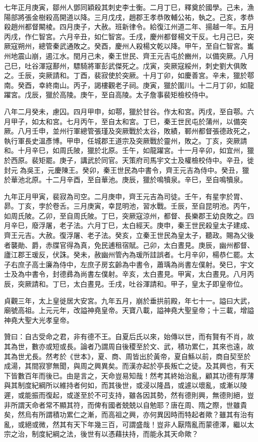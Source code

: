 \begin{pinyinscope}
 七年正月庚寅，鄒州人鄧同穎殺其刺史李士衡。二月丁巳，釋奠於國學。己未，漁陽部將張金樹殺高開道以降。三月戊戌，趙郡王孝恭敗輔公祐，執之。己亥，孝恭殺趙州都督闞棱。四月庚子，大赦。班新律令。給復江州道二年、揚越一年。五月丙戌，作仁智宮。六月辛丑，如仁智宮。壬戌，慶州都督楊文干反。七月己巳，突厥寇朔州，總管秦武通敗之。癸酉，慶州人殺楊文乾以降。甲午，至自仁智宮。巂州地震山崩，遏江水。閏月己未，秦王世民、齊王元吉屯於豳州，以備突厥。八月己巳，吐谷渾寇鄯州，驃騎將軍彭武傑死之。戊寅，突厥寇綏州，刺史劉大俱敗之。壬辰，突厥請和。丁酉，裴寂使於突厥。十月丁卯，如慶善宮。辛未，獵於鄠南。癸酉，幸終南山。丙子，謁樓觀老子祠。庚寅，獵於圍川。十二月丁卯，如龍躍宮。戊辰，獵於高陵。庚午，至自高陵。太子詹事裴矩檢校侍中。



 八年二月癸未，慮囚。四月甲申，如鄠，獵於甘谷。作太和宮。丙戌，至自鄠。六月甲子，如太和宮。七月丙午，至自太和宮。丁巳，秦王世民屯於蒲州，以備突厥。八月壬申，並州行軍總管張瑾及突厥戰於太谷，敗績，鄆州都督張德政死之，執行軍長史溫彥博。甲申，任城郡王道宗及突厥戰於靈州，敗之。丁亥，突厥請和。十月辛巳，如周氏陂，獵於北原。壬午，如龍躍宮。十一月辛卯，如宜州，獵於西原。裴矩罷。庚子，講武於同官。天策府司馬宇文士及權檢校侍中。辛丑，徙封元為吳王，元慶陳王。癸卯，秦王世民為中書令，齊王元吉為侍中。癸丑，獵於華池北原。十二月辛酉，至自華池。庚辰，獵於鳴犢泉。辛巳，至自鳴犢泉。



 九年正月甲寅，裴寂為司空。二月庚申，齊王元吉為司徒。壬午，有星孛於胃、昴。丁亥，孛於卷舌。三月庚寅，幸昆明池，習水戰。壬辰，至自昆明池。丙午，如周氏陂。乙卯，至自周氏陂。丁巳，突厥寇涼州，都督、長樂郡王幼良敗之。四月辛巳，廢浮屠，老子法。六月丁巳，太白經天。庚申，秦王世民殺皇太子建成、齊王元吉。大赦。復浮屠、老子法。癸亥，立秦王世民為皇太子，聽政。賜為父後者襲勛、爵，赤牒官得為真，免民逋租宿賦。己卯，太白晝見。庚辰，幽州都督、廬江郡王瑗反，伏誅。癸未，赦幽州管內為瑗所詿誤者。七月辛卯，楊恭仁罷。太子右庶子高士廉為侍中，左庶子房玄齡為中書令，蕭瑀為尚書左僕射。癸巳，宇文士及為中書令，封德彞為尚書左僕射。辛亥，太白晝見。甲寅，太白晝見。八月丙辰，突厥請和。丁巳，太白晝見。壬戌，吐谷渾請和。甲子，皇太子即皇帝位。



 貞觀三年，太上皇徙居大安宮。九年五月，崩於垂拱前殿，年七十一。謚曰大武，廟號高祖。上元元年，改謚神堯皇帝。天寶八載，謚神堯大聖皇帝；十三載，增謚神堯大聖大光孝皇帝。



 贊曰：自古受命之君，非有德不王。自夏后氏以來，始傳以世，而有賢有不肖，故其為世，數亦或短或長。論者乃謂周自後稷至於文、武，積功累仁，其來也遠，故其為世尤長。然考於《世本》，夏、商、周皆出於黃帝，夏自鯀以前，商自契至於成湯，其間寂寥無聞，與周之興異矣。而漢亦起於亭長叛亡之徒。及其興也，有天下皆數百年而後已。由是言之，天命豈易知哉！然考其終始治亂，顧其功德有厚薄與其制度紀綱所以維持者何如，而其後世，或浸以隆昌，或遽以壞亂，或漸以陵遲，或能振而復起，或遂至於不可支持，雖各因其勢，然有德則興，無德則絕，豈非所謂天命者常不顯其符，而俾有國者兢兢以自勉耶？唐在周、隋之際，世雖貴矣，然烏有所謂積功累仁之漸，而高祖之興，亦何異因時而特起者歟？雖其有治有亂，或絕或微，然其有天下年幾三百，可謂盛哉！豈非人厭隋亂而蒙德澤，繼以太宗之治，制度紀綱之法，後世有以憑藉扶持，而能永其天命歟？



\end{pinyinscope}
